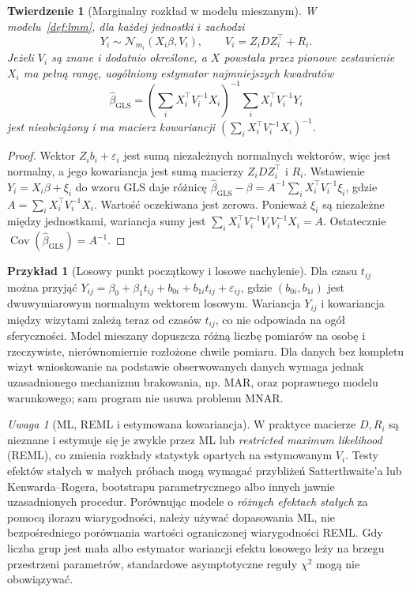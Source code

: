 \documentclass[11pt,a4paper,oneside]{report}
\numberwithin{equation}{chapter}
\theoremstyle{plain}
\newtheorem{twierdzenie}{Twierdzenie}[chapter]
\theoremstyle{definition}
\newtheorem{przyklad}{Przykład}[chapter]
\theoremstyle{remark}
\newtheorem{uwaga}{Uwaga}[chapter]
\newcommand{\Cov}{\operatorname{Cov}}
\newcommand{\Normal}{\mathcal N}
\begin{document}
\begin{twierdzenie}[Marginalny rozkład w modelu mieszanym]\label{thm:lmm-marginal}
W modelu~\ref{def:lmm}, dla każdej jednostki $i$ zachodzi
\[
 Y_i\sim\Normal_{m_i}(X_i\beta,V_i),\qquad V_i=Z_iDZ_i^\top+R_i.
\]
Jeżeli $V_i$ są znane i dodatnio określone, a $X$ powstała przez pionowe zestawienie $X_i$ ma pełną rangę, uogólniony estymator najmniejszych kwadratów
\[
 \widehat\beta_{\mathrm{GLS}}=\left(\sum_iX_i^\top V_i^{-1}X_i\right)^{-1}\sum_iX_i^\top V_i^{-1}Y_i
\]
jest nieobciążony i ma macierz kowariancji $\left(\sum_iX_i^\top V_i^{-1}X_i\right)^{-1}$.
\end{twierdzenie}
\begin{proof}
Wektor $Z_ib_i+\varepsilon_i$ jest sumą niezależnych normalnych wektorów, więc jest normalny, a jego kowariancja jest sumą macierzy $Z_iDZ_i^\top$ i $R_i$. Wstawienie $Y_i=X_i\beta+\xi_i$ do wzoru GLS daje różnicę $\widehat\beta_{\mathrm{GLS}}-\beta=A^{-1}\sum_iX_i^\top V_i^{-1}\xi_i$, gdzie $A=\sum_iX_i^\top V_i^{-1}X_i$. Wartość oczekiwana jest zerowa. Ponieważ $\xi_i$ są niezależne między jednostkami, wariancja sumy jest $\sum_iX_i^\top V_i^{-1}V_iV_i^{-1}X_i=A$. Ostatecznie $\Cov(\widehat\beta_{\mathrm{GLS}})=A^{-1}$.
\end{proof}

\begin{przyklad}[Losowy punkt początkowy i losowe nachylenie]
Dla czasu $t_{ij}$ można przyjąć $Y_{ij}=\beta_0+\beta_1t_{ij}+b_{0i}+b_{1i}t_{ij}+\varepsilon_{ij}$, gdzie $(b_{0i},b_{1i})$ jest dwuwymiarowym normalnym wektorem losowym. Wariancja $Y_{ij}$ i kowariancja między wizytami zależą teraz od czasów $t_{ij}$, co nie odpowiada na ogół sferyczności. Model mieszany dopuszcza różną liczbę pomiarów na osobę i rzeczywiste, nierównomiernie rozłożone chwile pomiaru. Dla danych bez kompletu wizyt wnioskowanie na podstawie obserwowanych danych wymaga jednak uzasadnionego mechanizmu brakowania, np. MAR, oraz poprawnego modelu warunkowego; sam program nie usuwa problemu MNAR.
\end{przyklad}

\begin{uwaga}[ML, REML i estymowana kowariancja]
W praktyce macierze $D,R_i$ są nieznane i estymuje się je zwykle przez ML lub \emph{restricted maximum likelihood} (REML), co zmienia rozkłady statystyk opartych na estymowanym $V_i$. Testy efektów stałych w małych próbach mogą wymagać przybliżeń Satterthwaite'a lub Kenwarda--Rogera, bootstrapu parametrycznego albo innych jawnie uzasadnionych procedur. Porównując modele o \emph{różnych efektach stałych} za pomocą ilorazu wiarygodności, należy używać dopasowania ML, nie bezpośredniego porównania wartości ograniczonej wiarygodności REML. Gdy liczba grup jest mała albo estymator wariancji efektu losowego leży na brzegu przestrzeni parametrów, standardowe asymptotyczne reguły $\chi^2$ mogą nie obowiązywać.
\end{uwaga}
\end{document}
